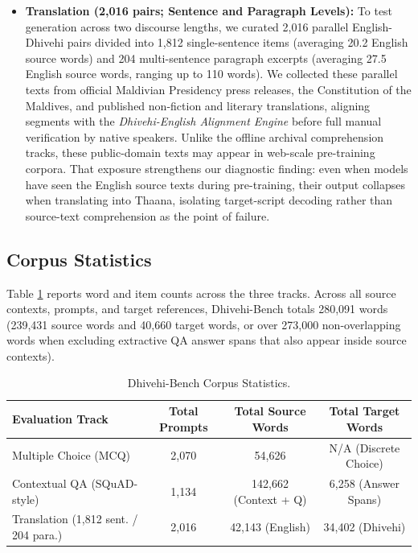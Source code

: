 \documentclass[acmsmall,review,anonymous]{acmart}
\begin{document}
\begin{itemize}
    \item \textbf{Translation (2,016 pairs; Sentence and Paragraph Levels):} To test generation across two discourse lengths, we curated 2,016 parallel English-Dhivehi pairs divided into 1,812 single-sentence items (averaging 20.2 English source words) and 204 multi-sentence paragraph excerpts (averaging 27.5 English source words, ranging up to 110 words). We collected these parallel texts from official Maldivian Presidency press releases, the Constitution of the Maldives, and published non-fiction and literary translations, aligning segments with the \textit{Dhivehi-English Alignment Engine} before full manual verification by native speakers. Unlike the offline archival comprehension tracks, these public-domain texts may appear in web-scale pre-training corpora. That exposure strengthens our diagnostic finding: even when models have seen the English source texts during pre-training, their output collapses when translating into Thaana, isolating target-script decoding rather than source-text comprehension as the point of failure.
\end{itemize}

\subsection{Corpus Statistics}
\label{sec:corpus_stats}
Table \ref{tab:stats} reports word and item counts across the three tracks. Across all source contexts, prompts, and target references, Dhivehi-Bench totals 280,091 words (239,431 source words and 40,660 target words, or over 273,000 non-overlapping words when excluding extractive QA answer spans that also appear inside source contexts).

\begin{table}[t]
\centering
\caption{Dhivehi-Bench Corpus Statistics.}
\label{tab:stats}
\begin{tabular}{lccc}
\toprule
\textbf{Evaluation Track} & \textbf{Total Prompts} & \textbf{Total Source Words} & \textbf{Total Target Words} \\
\midrule
Multiple Choice (MCQ) & 2,070 & 54,626 & N/A (Discrete Choice) \\
Contextual QA (SQuAD-style) & 1,134 & 142,662 (Context + Q) & 6,258 (Answer Spans) \\
Translation (1,812 sent. / 204 para.) & 2,016 & 42,143 (English) & 34,402 (Dhivehi) \\
\bottomrule
\end{tabular}
\end{table}
\end{document}
